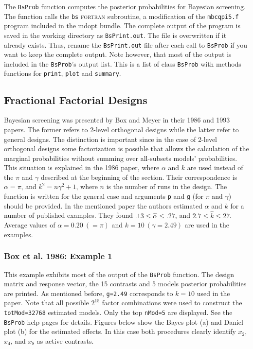 \documentclass[letterpaper]{article}
\begin{document}
The \texttt{BsProb} function computes the posterior probabilities for
Bayesian screening. The function calls the \texttt{bs} \textsc{fortran}
subroutine, a modification of the \texttt{mbcqpi5.f} program included in the
\textsf{mdopt} bundle. The complete output of the program is saved in the
working directory as \texttt{BsPrint.out}. The file is overwritten if it
already exists. Thus, rename the \texttt{BsPrint.out} file after each call to
\texttt{BsProb} if you want to keep the complete output. Note however, that
most of the output is included in the \texttt{BsProb}'s output list. This is
a list of class \texttt{BsProb} with methods functions for \texttt{print},
\texttt{plot} and \texttt{summary}.

\subsection{Fractional Factorial Designs}

Bayesian screening was presented by Box and Meyer in their 1986 and 1993
papers. The former refers to 2-level orthogonal designs while the latter
refer to general designs. The distinction is important since in the case of
2-level orthogonal designs some factorization is possible that allows the
calculation of the marginal probabilities without summing over all-subsets
models' probabilities. This situation is explained in the 1986 paper, where
$\alpha$ and $k$ are used instead of the $\pi$ and $\gamma$ described at the
beginning of the section. Their correspondence is $\alpha=\pi$, and
$k^2=n\gamma^2+1$, where $n$ is the number of runs in the design. The
function is written for the general case and arguments \texttt{p} and
\texttt{g} (for $\pi$ and $\gamma$) should be provided. In the mentioned
paper the authors estimated $\alpha$ and $k$ for a number of published
examples. They found $.13\leq \hat{\alpha} \leq .27$, and $2.7\leq
\hat{k}\leq 27$. Average values of $\alpha=0.20\ (=\pi)$ and $k=10\
(\gamma=2.49)$ are used in the examples.

\subsubsection{Box et al. 1986: Example 1}

This example exhibits most of the output of the \texttt{BsProb} function. The
design matrix and response vector, the 15 contrasts and 5 models posterior
probabilities are printed. As mentioned before, \texttt{g=2.49} corresponds
to $k=10$ used in the paper. Note that all possible $2^{15}$ factor
combinations were used to construct the \texttt{totMod=32768} estimated
models. Only the top \texttt{nMod=5} are displayed. See the \texttt{BsProb}
help pages for details. Figures below show the Bayes plot (a) and Daniel plot
(b) for the estimated effects. In this case both procedures clearly identify
$x_2$, $x_4$, and $x_8$ as active contrasts.
\end{document}
